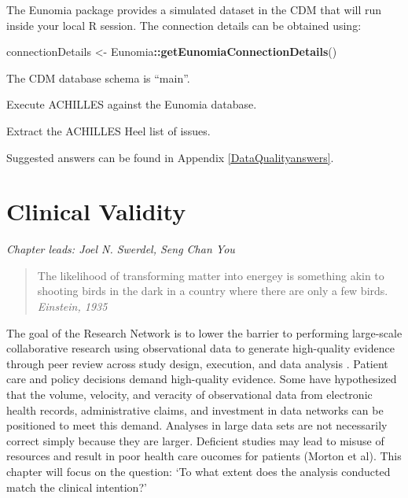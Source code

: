 \documentclass[11pt]{book}
\newenvironment{Shaded}{\begin{snugshade}}{\end{snugshade}}
\newcommand{\KeywordTok}[1]{\textcolor[rgb]{0.13,0.29,0.53}{\textbf{#1}}}
\newcommand{\NormalTok}[1]{#1}
\newcommand{\OperatorTok}[1]{\textcolor[rgb]{0.81,0.36,0.00}{\textbf{#1}}}
\newcommand{\StringTok}[1]{\textcolor[rgb]{0.31,0.60,0.02}{#1}}
\theoremstyle{definition}
\theoremstyle{definition}
\theoremstyle{definition}
\theoremstyle{remark}
\let\BeginKnitrBlock\begin \let\EndKnitrBlock\end
\begin{document}
The Eunomia package provides a simulated dataset in the CDM that will run inside your local R session. The connection details can be obtained using:

\begin{Shaded}
\begin{Highlighting}[]
\NormalTok{connectionDetails <-}\StringTok{ }\NormalTok{Eunomia}\OperatorTok{::}\KeywordTok{getEunomiaConnectionDetails}\NormalTok{()}
\end{Highlighting}
\end{Shaded}

The CDM database schema is ``main''.

\BeginKnitrBlock{exercise}
\protect\hypertarget{exr:exerciseRunAchilles}{}{\label{exr:exerciseRunAchilles} }Execute ACHILLES against the Eunomia database.
\EndKnitrBlock{exercise}

\BeginKnitrBlock{exercise}
\protect\hypertarget{exr:exerciseViewHeel}{}{\label{exr:exerciseViewHeel} }Extract the ACHILLES Heel list of issues.
\EndKnitrBlock{exercise}

Suggested answers can be found in Appendix \ref{DataQualityanswers}.

\hypertarget{ClinicalValidity}{%
\chapter{Clinical Validity}\label{ClinicalValidity}}

\emph{Chapter leads: Joel N. Swerdel, Seng Chan You}

\begin{quote}
The likelihood of transforming matter into energey is something akin to shooting birds in the dark in a country where there are only a few birds. \emph{Einstein, 1935}
\end{quote}

The goal of the Research Network is to lower the barrier to performing large-scale collaborative research using observational data to generate high-quality evidence through peer review across study design, execution, and data analysis \citep{Hripcsak2015}. Patient care and policy decisions demand high-quality evidence. Some have hypothesized that the volume, velocity, and veracity of observational data from electronic health records, administrative claims, and investment in data networks can be positioned to meet this demand. Analyses in large data sets are not necessarily correct simply because they are larger. Deficient studies may lead to misuse of resources and result in poor health care oucomes for patients (Morton et al). This chapter will focus on the question: `To what extent does the analysis conducted match the clinical intention?' 
\end{document}
